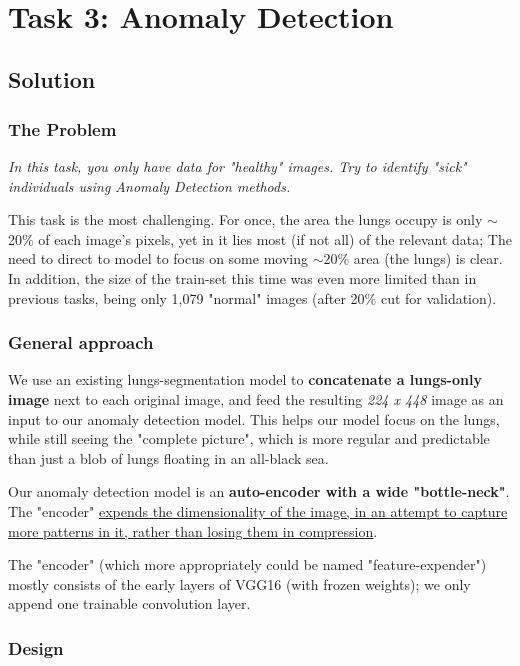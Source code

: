 \documentclass{article}
\begin{document}
\
\section{Task 3: Anomaly Detection}

\subsection{Solution}

\subsubsection{The Problem}
\textit{In this task, you only have data for "healthy" images. Try to identify "sick" individuals using Anomaly Detection methods.}

This task is the most challenging. For once, the area the lungs occupy is only $\sim$20\% of each image's pixels, yet in it lies most (if not all) of the relevant data; The need to direct to model to focus on some moving $\sim$20\% area (the lungs) is clear. In addition, the size of the train-set this time was even more limited than in previous tasks, being only 1,079 "normal" images (after 20\% cut for validation).

\subsubsection{General approach}
We use an existing lungs-segmentation model to \textbf{concatenate a lungs-only image} next to each original image, and feed the resulting \textit{224 x 448} image as an input to our anomaly detection model. This helps our model focus on the lungs, while still seeing the "complete picture", which is more regular and predictable than just a blob of lungs floating in an all-black sea.

Our anomaly detection model is an \textbf{auto-encoder with a wide "bottle-neck"}. The "encoder" \uline{expends the dimensionality of the image, in an attempt to capture more patterns in it, rather than losing them in compression}.

The "encoder" (which more appropriately could be named "feature-expender") mostly consists of the early layers of VGG16 (with frozen weights); we only append one trainable convolution layer.

\subsubsection{Design}
\end{document}
